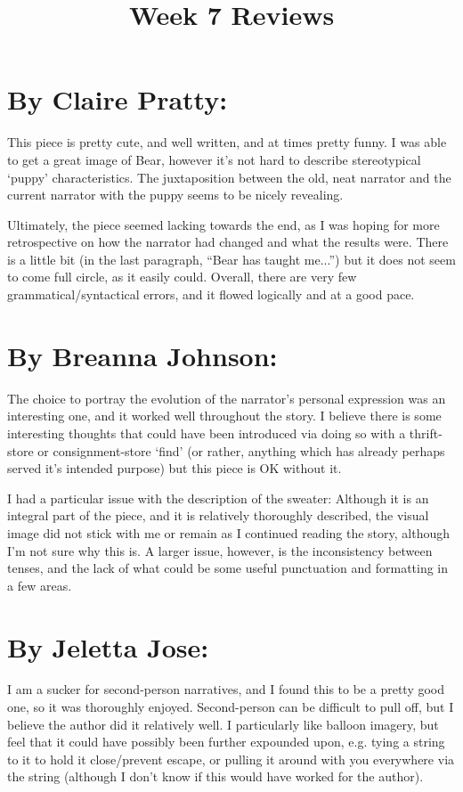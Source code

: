 \documentclass[letterpaper]{article}
\title{Week 7 Reviews}
\date{}
\begin{document}
	\maketitle
	\onehalfspacing
	\section{By Claire Pratty:}
		This piece is pretty cute, and well written, and at times pretty funny. I was able to get a great image of Bear, however it's not hard to describe stereotypical `puppy' characteristics. The juxtaposition between the old, neat narrator and the current narrator with the puppy seems to be nicely revealing. 
		
		Ultimately, the piece seemed lacking towards the end, as I was hoping for more retrospective on how the narrator had changed and what the results were. There is a little bit (in the last paragraph, ``Bear has taught me...'') but it does not seem to come full circle, as it easily could. Overall, there are very few grammatical/syntactical errors, and it flowed logically and at a good pace.
	\section{By Breanna Johnson:}
		The choice to portray the evolution of the narrator's personal expression was an interesting one, and it worked well throughout the story. I believe there is some interesting thoughts that could have been introduced via doing so with a thrift-store or consignment-store `find' (or rather, anything which has already perhaps served it's intended purpose) but this piece is OK without it. 

		I had a particular issue with the description of the sweater: Although it is an integral part of the piece, and it is relatively thoroughly described, the visual image did not stick with me or remain as I continued reading the story, although I'm not sure why this is. A larger issue, however, is the inconsistency between tenses, and the lack of what could be some useful punctuation and formatting in a few areas.
	\section{By Jeletta Jose:}
		I am a sucker for second-person narratives, and I found this to be a pretty good one, so it was thoroughly enjoyed. Second-person can be difficult to pull off, but I believe the author did it relatively well. I particularly like balloon imagery, but feel that it could have possibly been further expounded upon, e.g. tying a string to it to hold it close/prevent escape, or pulling it around with you everywhere via the string (although I don't know if this would have worked for the author).
		
\end{document}
